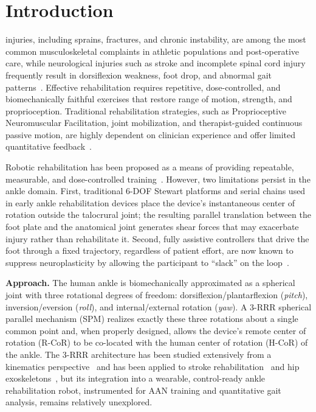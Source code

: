 \documentclass[conference]{IEEEtran}
\begin{document}
\section{Introduction}

 injuries, including sprains, fractures, and chronic instability, are among the most common musculoskeletal complaints in athletic populations and post-operative care, while neurological injuries such as stroke and incomplete spinal cord injury frequently result in dorsiflexion weakness, foot drop, and abnormal gait patterns~\cite{dong2021parallelankle,sale2012robot}. Effective rehabilitation requires repetitive, dose-controlled, and biomechanically faithful exercises that restore range of motion, strength, and proprioception. Traditional rehabilitation strategies, such as Proprioceptive Neuromuscular Facilitation, joint mobilization, and therapist-guided continuous passive motion, are highly dependent on clinician experience and offer limited quantitative feedback~\cite{marchal2009review}.

Robotic rehabilitation has been proposed as a means of providing repeatable, measurable, and dose-controlled training~\cite{dollar2008lower,marchal2009review}. However, two limitations persist in the ankle domain. First, traditional 6-DOF Stewart platforms and serial chains used in early ankle rehabilitation devices place the device's instantaneous center of rotation outside the talocrural joint; the resulting parallel translation between the foot plate and the anatomical joint generates shear forces that may exacerbate injury rather than rehabilitate it. Second, fully assistive controllers that drive the foot through a fixed trajectory, regardless of patient effort, are now known to suppress neuroplasticity by allowing the participant to ``slack'' on the loop~\cite{cai2006implications,marchal2009review}.

\textbf{Approach.} The human ankle is biomechanically approximated as a spherical joint with three rotational degrees of freedom: dorsiflexion/plantarflexion (\emph{pitch}), inversion/eversion (\emph{roll}), and internal/external rotation (\emph{yaw}). A 3-RRR spherical parallel mechanism (SPM) realizes exactly these three rotations about a single common point and, when properly designed, allows the device's remote center of rotation (R-CoR) to be co-located with the human center of rotation (H-CoR) of the ankle. The 3-RRR architecture has been studied extensively from a kinematics perspective~\cite{gosselin1989optimum,merlet2006jacobian,saheb2021math} and has been applied to stroke rehabilitation~\cite{he2021spindle} and hip exoskeletons~\cite{sadeqi2017hip}, but its integration into a wearable, control-ready ankle rehabilitation robot, instrumented for AAN training and quantitative gait analysis, remains relatively unexplored.
\end{document}
